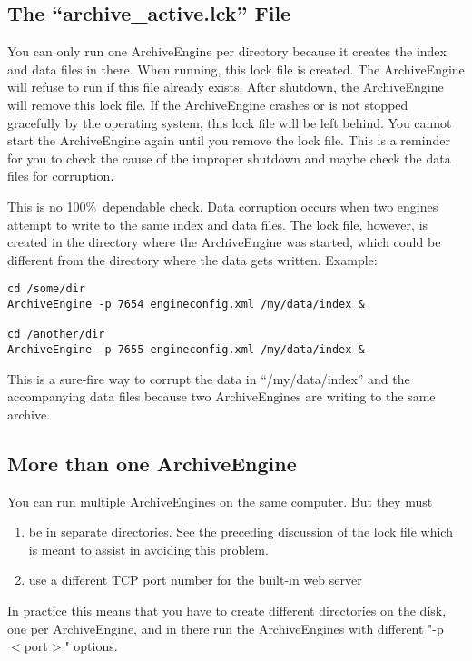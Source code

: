 \subsection{The ``archive\_active.lck'' File}
You can only run one ArchiveEngine per directory because it creates
the index and data files in there.  When running, this lock file is
created. The ArchiveEngine will refuse to run if this file already
exists.  After shutdown, the ArchiveEngine will remove this lock file.
If the ArchiveEngine crashes or is not stopped gracefully by the
operating system, this lock file will be left behind.  You cannot
start the ArchiveEngine again until you remove the lock file. This is
a reminder for you to check the cause of the improper shutdown and
maybe check the data files for corruption.

\NOTE This is no 100\%\ dependable check. Data corruption occurs when
two engines attempt to write to the same index and data files. The
lock file, however, is created in the directory where the
ArchiveEngine was started, which could be different from the directory
where the data gets written. Example:

\begin{lstlisting}[frame=none,keywordstyle=\sffamily]
cd /some/dir
ArchiveEngine -p 7654 engineconfig.xml /my/data/index &

cd /another/dir
ArchiveEngine -p 7655 engineconfig.xml /my/data/index &
\end{lstlisting}

\noindent This is a sure-fire way to corrupt the data in
``/my/data/index'' and the accompanying data files because two
ArchiveEngines are writing to the same archive.

\subsection{More than one ArchiveEngine}
You can run multiple ArchiveEngines on the same
computer. But they must
\begin{enumerate}
\item be in separate directories. See the preceding discussion of
      the lock file which is meant to assist in avoiding this
      problem.
\item use a different TCP port number for the built-in web server
\end{enumerate}
In practice this means that you have to create different directories
on the disk, one per ArchiveEngine, and in there run the
ArchiveEngines with different "-p $<$port$>$" options.

